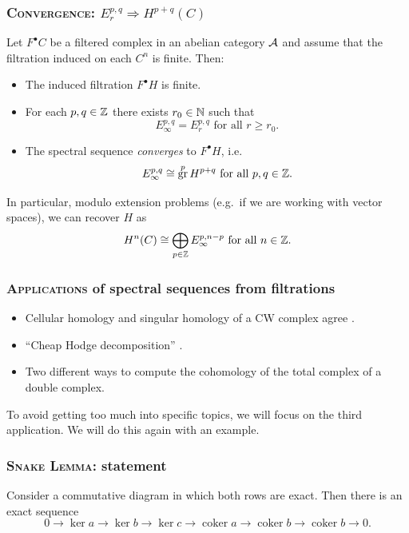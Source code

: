 \documentclass[notheorems, hyperref={backref}]{beamer}
\theoremstyle{plain}
\theoremstyle{definition}
\theoremstyle{darkredexample}
\theoremstyle{remark}
\DeclareMathOperator{\gr}{gr}
\DeclareMathOperator{\coker}{coker}
\begin{document}
\begin{frame}
    \frametitle{\textsc{Convergence}: $E_{r}^{p,q}\Rightarrow H^{p+q}(C)$ \cite[Theorem 2.6]{mcc01}}
    Let $F^{\bullet}C$ be a filtered complex in an abelian category $\mathcal{A}$ and assume that the filtration induced on each $C^{n}$ is finite.
    Then:
    \pause
    \begin{itemize}
	\item The induced filtration $F^{\bullet}H$ is finite.
	\item For each $p,q\in \mathbb{Z}$ there exists $r_{0}\in \mathbb{N}$ such that
	    \[ E_{\infty}^{p,q}=E_{r}^{p,q} \text{ for all } r\geqslant r_{0}. \]
	\item The spectral sequence \textit{converges} to $F^{\bullet}H$, i.e.
	    \[ E_{\infty}^{p,q}\cong \gr^{p}H^{p+q} \text{ for all }p,q\in\Z. \]
    \end{itemize}
    In particular, modulo extension problems (e.g.~if we are working with vector spaces), we can recover $H$ as
    \[ H^{n}(C)\cong \bigoplus_{p\in \mathbb{Z}}E_{\infty}^{p,n-p}\text{ for all }n\in\mathbb{Z}. \]
\end{frame}

\begin{frame}
    \frametitle{\textsc{Applications} of spectral sequences from filtrations}
    \begin{itemize}
	\item Cellular homology and singular homology of a CW complex agree \cite[Theorem 4.13]{mcc01}.
	    \pause

	\item ``Cheap Hodge decomposition'' \cite[Remark 8.29]{voi02}.
	    \pause

	\item Two different ways to compute the cohomology of the total complex of a double complex.
    \end{itemize}
    \pause

    To avoid getting too much into specific topics, we will focus on the third application.
    We will do this again with an example.
\end{frame}

\begin{frame}
    \frametitle{\textsc{Snake Lemma}: statement}
    Consider a commutative diagram
    in which both rows are exact.
    \pause
    Then there is an exact sequence
    \[ 0\to \ker{a}\to \ker{b}\to \ker{c}\to \coker{a}\to \coker{b}\to \coker{b}\to 0. \]
\end{frame}
\end{document}
